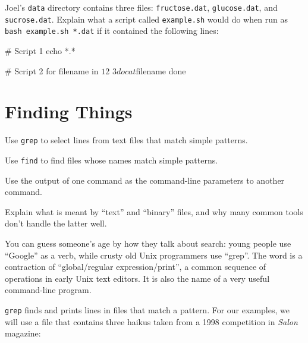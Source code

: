 \begin{challenge}
  Joel's \texttt{data} directory contains three files:
  \texttt{fructose.dat}, \texttt{glucose.dat}, and \texttt{sucrose.dat}.
  Explain what a script called \texttt{example.sh} would do when run as
  \texttt{bash example.sh *.dat} if it contained the following lines:

\begin{VerbFile}
# Script 1
echo *.*
\end{VerbFile}

\begin{VerbFile}
# Script 2
for filename in $1 $2 $3
do
    cat $filename
done
\end{VerbFile}


\end{challenge}

\section{Finding Things}

\begin{objectives}
\begin{swcitemize}
\item
  Use \texttt{grep} to select lines from text files that match simple
  patterns.
\item
  Use \texttt{find} to find files whose names match simple patterns.
\item
  Use the output of one command as the command-line parameters to
  another command.
\item
  Explain what is meant by ``text'' and ``binary'' files, and why many
  common tools don't handle the latter well.
\end{swcitemize}
\end{objectives}

You can guess someone's age by how they talk about search: young people
use ``Google'' as a verb, while crusty old Unix programmers use
``grep''. The word is a contraction of ``global/regular
expression/print'', a common sequence of operations in early Unix text
editors. It is also the name of a very useful command-line program.

\texttt{grep} finds and prints lines in files that match a pattern. For
our examples, we will use a file that contains three haikus taken from a
1998 competition in \emph{Salon} magazine:


